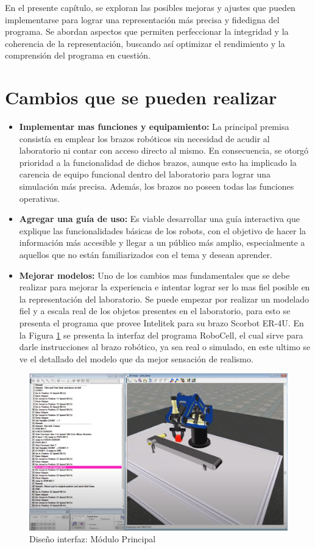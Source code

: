 En el presente capítulo, se exploran las posibles mejoras y ajustes que pueden implementarse para lograr una representación más precisa y fidedigna del programa. Se abordan aspectos que permiten perfeccionar la integridad y la coherencia de la representación, buscando así optimizar el rendimiento y la comprensión del programa en cuestión.
\section{Cambios que se pueden realizar}
\begin{itemize}
    \item \textbf{Implementar mas funciones y equipamiento:} La principal premisa consistía en emplear los brazos robóticos sin necesidad de acudir al laboratorio ni contar con acceso directo al mismo. En consecuencia, se otorgó prioridad a la funcionalidad de dichos brazos, aunque esto ha implicado la carencia de equipo funcional dentro del laboratorio para lograr una simulación más precisa. Además, los brazos no poseen todas las funciones operativas.
    \item \textbf{Agregar una guía de uso:} Es viable desarrollar una guía interactiva que explique las funcionalidades básicas de los robots, con el objetivo de hacer la información más accesible y llegar a un público más amplio, especialmente a aquellos que no están familiarizados con el tema y desean aprender.
    \item \textbf{Mejorar modelos:} Uno de los cambios mas fundamentales que se debe realizar para mejorar la experiencia e intentar lograr ser lo mas fiel posible en la representación del laboratorio.
    Se puede empezar por realizar un modelado fiel y a escala real de los objetos presentes en el laboratorio, para esto se presenta el programa que provee Intelitek para su brazo Scorbot ER-4U.
    En la Figura \ref{fig:modelo} se presenta la interfaz del programa RoboCell, el cual sirve para darle instrucciones al brazo robótico, ya sea real o simulado, en este ultimo se ve el detallado del modelo que da mejor sensación de realismo.
\end{itemize}
\clearpage
\begin{figure}[h]
\centering
\includegraphics[width=13cm]{figures/modelo.png}
\caption{Diseño interfaz: Módulo Principal}
\label{fig:modelo}
\end{figure}
